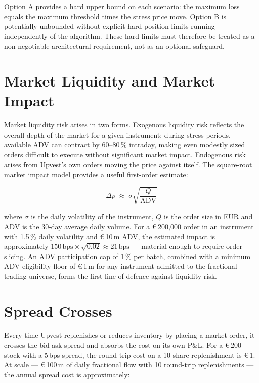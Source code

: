 \documentclass[12pt,a4paper]{report}
\newcommand{\eur}{\euro\,}
\begin{document}
Option A provides a hard upper bound on each scenario: the maximum loss equals the
maximum threshold times the stress price move. Option B is potentially unbounded without
explicit hard position limits running independently of the algorithm. These hard limits
must therefore be treated as a non-negotiable architectural requirement, not as an
optional safeguard.

\section{Market Liquidity and Market Impact}

Market liquidity risk arises in two forms. Exogenous liquidity risk reflects the overall
depth of the market for a given instrument; during stress periods, available ADV can
contract by 60--80\,\% intraday, making even modestly sized orders difficult to execute
without significant market impact. Endogenous risk arises from Upvest's own orders
moving the price against itself. The square-root market impact model provides a useful
first-order estimate:

\begin{equation}
  \Delta p \;\approx\; \sigma \sqrt{\frac{Q}{\text{ADV}}}
  \label{eq:impact}
\end{equation}

where $\sigma$ is the daily volatility of the instrument, $Q$ is the order size in EUR
and ADV is the 30-day average daily volume. For a \eur{}200{,}000 order in an instrument
with 1.5\,\% daily volatility and \eur{}10\,m ADV, the estimated impact is approximately
$150\,\text{bps} \times \sqrt{0.02} \approx 21\,\text{bps}$ --- material enough to
require order slicing. An ADV participation cap of 1\,\% per batch, combined with a
minimum ADV eligibility floor of \eur{}1\,m for any instrument admitted to the fractional
trading universe, forms the first line of defence against liquidity risk.

\section{Spread Crosses}

Every time Upvest replenishes or reduces inventory by placing a market order, it crosses
the bid-ask spread and absorbs the cost on its own P\&L. For a \eur{}200 stock with a
5\,bps spread, the round-trip cost on a 10-share replenishment is \eur{}1. At scale ---
\eur{}100\,m of daily fractional flow with 10 round-trip replenishments --- the annual
spread cost is approximately:
\end{document}
